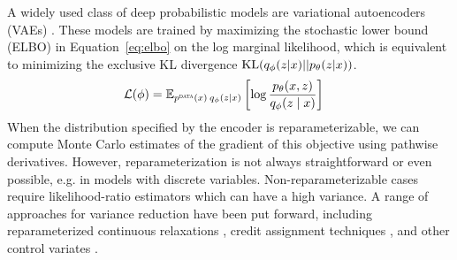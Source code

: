 \documentclass{article}
\theoremstyle{definition}
\begin{document}
A widely used class of deep probabilistic models are variational autoencoders (VAEs) \cite{kingma2013auto-encoding, rezende2014stochastic}.
These models are trained by maximizing the stochastic lower bound (ELBO) in Equation~\ref{eq:elbo} on the log marginal likelihood, which is equivalent to minimizing the exclusive KL divergence $\mathrm{KL}(q_\phi(z | x) || p_\theta(z | x))$. 
\begin{align}
    \label{eq:elbo}
    \mathcal{L} (\phi)
    &
    = 
    \mathbb{E}_{p^\textsc{data}(x) \: q_\phi(z \mid x)}
    \left[
       \log \frac{p_\theta(x, z)}{q_\phi(z \mid x)}
    \right] 
\end{align}
When the distribution specified by the encoder is reparameterizable, we can compute Monte Carlo estimates of the gradient of this objective using pathwise derivatives. However, reparameterization is not always straightforward or even possible, e.g. in models with discrete variables. Non-reparameterizable cases require likelihood-ratio estimators  \cite{williams1992simple} %
which can have a high variance. A range of approaches for variance reduction have been put forward, including reparameterized continuous relaxations \cite{maddison2017concrete,jang2017categorical}, credit assignment techniques \cite{weber2019credit}, and other control variates \cite{mnih2016variational,tucker2017rebar,grathwohl2018backpropagation}. 
\end{document}
